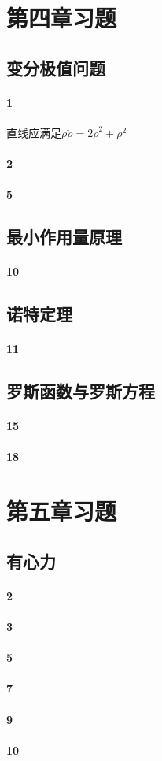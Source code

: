 \documentclass[a4paper]{article}
\begin{document}
\section{第四章习题}
\subsection{变分极值问题}
\paragraph{1}
直线应满足$\rho\ddot{\rho}=2\dot{\rho}^2+\rho^2$
\paragraph{2}
\paragraph{5}
\subsection{最小作用量原理}
\paragraph{10}
\subsection{诺特定理}
\paragraph{11}
\subsection{罗斯函数与罗斯方程}
\paragraph{15}
\paragraph{18}
\section{第五章习题}
\subsection{有心力}
\paragraph{2}
\paragraph{3}
\paragraph{5}
\paragraph{7}
\paragraph{9}
\paragraph{10}
\end{document}
